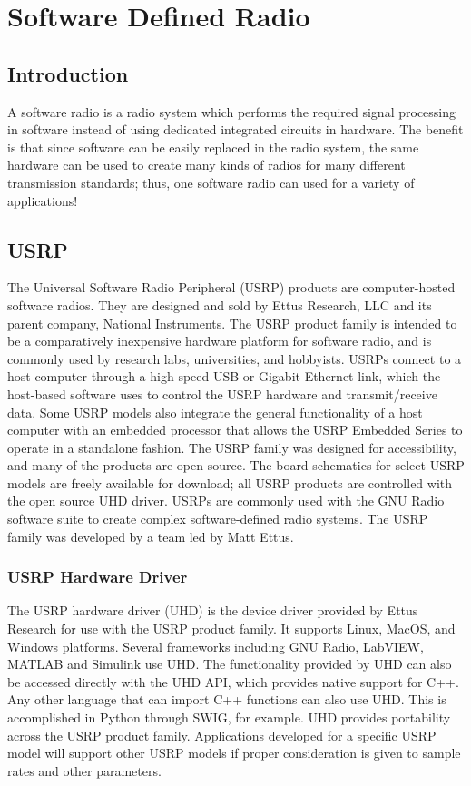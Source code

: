 \chapter{Software Defined Radio}


\section{Introduction}
A software radio is a radio system which performs the required signal processing in software instead of using dedicated integrated circuits in hardware. The benefit is that since software can be easily replaced in the radio system, the same hardware can be used to create many kinds of radios for many different transmission standards; thus, one software radio can used for a variety of applications!


\section{USRP}
The Universal Software Radio Peripheral (USRP) products are computer-hosted software radios. They are designed and sold by Ettus Research, LLC and its parent company, National Instruments. The USRP product family is intended to be a comparatively inexpensive hardware platform for software radio, and is commonly used by research labs, universities, and hobbyists. USRPs connect to a host computer through a high-speed USB or Gigabit Ethernet link, which the host-based software uses to control the USRP hardware and transmit/receive data. Some USRP models also integrate the general functionality of a host computer with an embedded processor that allows the USRP Embedded Series to operate in a standalone fashion.
The USRP family was designed for accessibility, and many of the products are open source. The board schematics for select USRP models are freely available for download; all USRP products are controlled with the open source UHD driver. USRPs are commonly used with the GNU Radio software suite to create complex software-defined radio systems.
The USRP family was developed by a team led by Matt Ettus.
\subsection{USRP Hardware Driver}
The USRP hardware driver (UHD) is the device driver provided by Ettus Research for use with the USRP product family. It supports Linux, MacOS, and Windows platforms. Several frameworks including GNU Radio, LabVIEW, MATLAB and Simulink use UHD. The functionality provided by UHD can also be accessed directly with the UHD API, which provides native support for C++. Any other language that can import C++ functions can also use UHD. This is accomplished in Python through SWIG, for example.
UHD provides portability across the USRP product family. Applications developed for a specific USRP model will support other USRP models if proper consideration is given to sample rates and other parameters.


